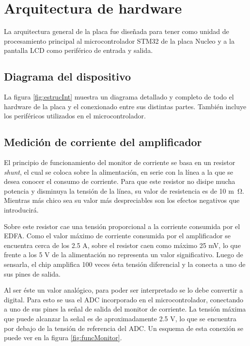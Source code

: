 \section{Arquitectura de hardware}

La arquitectura general de la placa fue diseñada para tener como unidad de procesamiento principal al microcontrolador STM32 de la placa Nucleo y a la pantalla LCD como periférico de entrada y salida.

\subsection{Diagrama del dispositivo}

La figura \ref{fig:estrucInt} muestra un diagrama detallado y completo de todo el hardware de la placa y el conexionado entre sus distintas partes. También incluye los periféricos utilizados en el microcontrolador.


\subsection{Medición de corriente del amplificador}

El principio de funcionamiento del monitor de corriente se basa en un resistor \textit{shunt}, el cual se coloca sobre la alimentación, en serie con la línea a la que se desea conocer el consumo de corriente. Para que este resistor no disipe mucha potencia y disminuya la tensión de la línea, su valor de resistencia es de 10 \si{m\ohm}. Mientras más chico sea su valor más despreciables son los efectos negativos que introducirá.

Sobre este resistor cae una tensión proporcional a la corriente consumida por el EDFA. Como el valor máximo de corriente consumida por el amplificador se encuentra cerca de los 2.5 A, sobre el resistor caen como máximo 25 mV, lo que frente a los 5 V de la alimentación no representa un valor significativo. Luego de sensarla, el chip amplifica 100 veces ésta tensión diferencial y la conecta a uno de sus pines de salida.

Al ser éste un valor analógico, para poder ser interpretado se lo debe convertir a digital. Para esto se usa el ADC incorporado en el microcontrolador, conectando a uno de sus pines la señal de salida del monitor de corriente. La tensión máxima que puede alcanzar la señal es de aproximadamente 2.5 V, lo que se encuentra por debajo de la tensión de referencia del ADC. Un esquema de esta conexión se puede ver en la figura \ref{fig:funcMonitor}.

